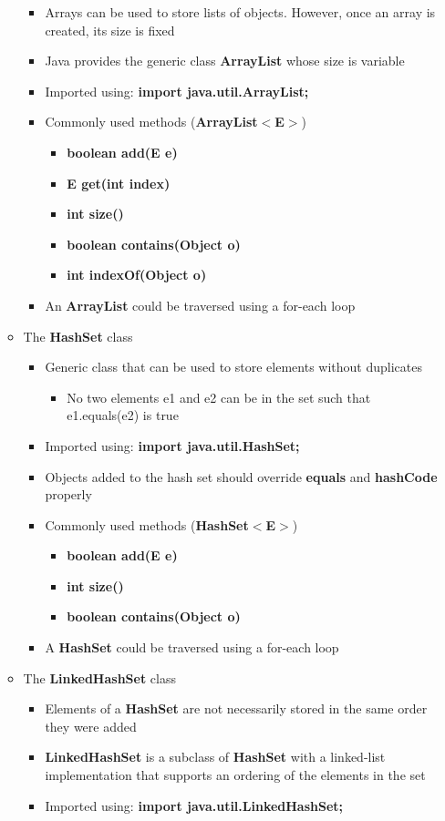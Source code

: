 \begin{itemize}
\begin{itemize}
\begin{itemize}
			\item Arrays can be used to store lists of objects. However, once an
			array is created, its size is fixed
			\item Java provides the generic class \textbf{ArrayList} whose size is variable
			\item Imported using: \textbf{import java.util.ArrayList;}
			\item Commonly used methods (\textbf{ArrayList$ < $E$ > $})
			\begin{itemize}
				\item \textbf{boolean add(E e)}
				\item \textbf{E get(int index)}
				\item \textbf{int size()}
				\item \textbf{boolean contains(Object o)}
				\item \textbf{int indexOf(Object o)}
			\end{itemize}
			\item An \textbf{ArrayList} could be traversed using a for-each loop
		\end{itemize}
		\item The \textbf{HashSet} class
		\begin{itemize}
			\item Generic class that can be used to store elements without duplicates
			\begin{itemize}
				\item No two elements e1 and e2 can be in the set such that e1.equals(e2) is true
			\end{itemize}
			\item Imported using: \textbf{import java.util.HashSet;}
			\item Objects added to the hash set should override \textbf{equals} and \textbf{hashCode} properly
			\item Commonly used methods (\textbf{HashSet$<$E$>$})
			\begin{itemize}
				\item \textbf{boolean add(E e)}
				\item \textbf{int size()}
				\item \textbf{boolean contains(Object o)}
			\end{itemize}
			\item A \textbf{HashSet} could be traversed using a for-each loop
		\end{itemize}

		\item The \textbf{LinkedHashSet} class
		\begin{itemize}
			\item Elements of a \textbf{HashSet} are not necessarily stored in the same
			order they were added
			\item \textbf{LinkedHashSet} is a subclass of \textbf{HashSet} with a linked-list implementation that supports an ordering of the elements in the set
			\item Imported using: \textbf{import java.util.LinkedHashSet;}
		\end{itemize}
	\end{itemize}


\end{itemize}
